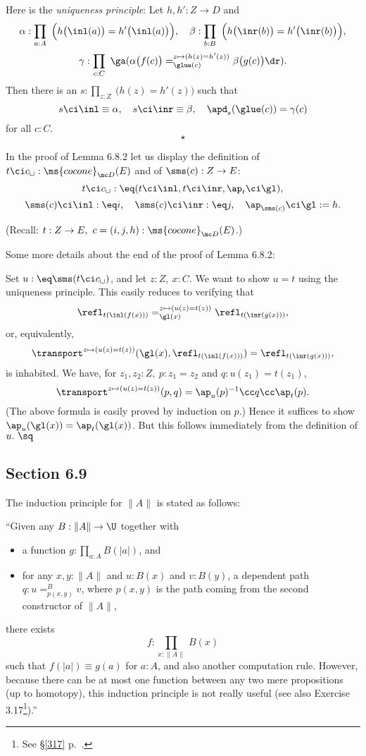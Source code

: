 \documentclass[12pt]{article}
\begin{document}
Here is the \emph{uniqueness principle}: Let $h,h':Z\to D$ and 
$$
\alpha:\prod_{a:A}\ \Big(h\big(\inl(a)\big)=h'\big(\inl(a)\big)\Big),\quad\beta:\prod_{b:B}\ \Big(h\big(\inr(b)\big)=h'\big(\inr(b)\big)\Big),
$$
$$
\gamma:\prod_{c:C}\ \ga(\alpha\big(f(c)\big)=^{z\mapsto(h(z)=h'(z))}_{\glue(c)}\beta\big(g(c)\big)\dr).
$$ 
Then there is an $s:\prod_{z:Z}\ \big(h(z)=h'(z)\big)$ such that 
$$
s\ci\inl\equiv\alpha,\quad s\ci\inr\equiv\beta,\quad\apd_s(\glue(c))=\gamma(c)
$$ 
for all $c:C$.  
$$
\star
$$

In the proof of Lemma 6.8.2 let us display the definition of $t\ci c_{\sqcup}:\ms{cocone}_{\mc D}(E)$ and of $\sms(c):Z\to E$: 
$$
t\ci c_{\sqcup}:\eq(t\ci\inl,t\ci\inr,\ap_t\ci\gl),
$$ 
$$
\sms(c)\ci\inl:\eq i,\quad\sms(c)\ci\inr :\eq j,\quad\ap_{\sms(c)}\ci\gl:=h.
$$ 

\nn(Recall: $t:Z\to E,\ c=(i,j,h):\ms{cocone}_{\mc D}(E)$.)

Some more details about the end of the proof of Lemma 6.8.2:

Set $u:\eq\sms(t\ci c_\sqcup)$, and let $z:Z,\ x:C$. We want to show $u=t$ using the uniqueness principle. This easily reduces to verifying that 
$$
\refl_{t(\inl(f(x)))}=_{\gl(x)}^{z\mapsto(u(z)=t(z))}\refl_{t(\inr(g(x)))},
$$ 
or, equivalently, 
$$
\transport^{z\mapsto(u(z)=t(z))}(\gl(x),\refl_{t(\inl(f(x)))})=\refl_{t(\inr(g(x)))},
$$ 
is inhabited. We have, for $z_1,z_2:Z,\ p:z_1=z_2$ and $q:u(z_1)=t(z_1)$, 
$$
\transport^{z\mapsto(u(z)=t(z))}(p,q)=\ap_u(p)^{-1}\cc q\cc\ap_t(p).
$$ 
(The above formula is easily proved by induction on $p$.) Hence it suffices to show $\ap_u(\gl(x))=\ap_t(\gl(x))$. But this follows immediately from the definition of $u.\ \sq$


\subsection{Section 6.9}\label{69}

The induction principle for $\lVert A\rVert$ is stated as follows:

\nn``Given any $B:\lVert A\rVert\to\U$ together with
\begin{itemize}
\item a function $g:\prod_{a:A}B(\lvert a\rvert)$, and
\item for any $x,y:\lVert A\rVert$ and $u:B(x)$ and $v:B(y)$, a dependent path $q:u=^B_{p(x,y)}v$, where $p(x,y)$ is the path coming from the second constructor of $\lVert A\rVert$,
\end{itemize}
there exists 
$$
f:\prod_{x:\lVert A\rVert}\ B(x)
$$ 
such that $f(\lvert a\rvert)\equiv g(a)$ for $a:A$, and also another computation rule. However, because there can be at most one function between any two mere propositions (up to homotopy), this induction principle is not really useful (see also Exercise 3.17\footnote{See \S\ref{317} p.~\pageref{317}.}).''
\end{document}
